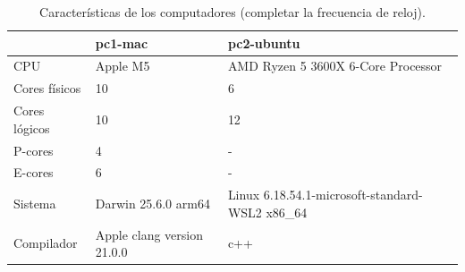 \begin{table}[H]
\centering\small
\caption{Características de los computadores (completar la frecuencia de reloj).}
\label{tab:g_maquinas}
\begin{tabular}{lll}
\toprule
 & pc1-mac & pc2-ubuntu \\
\midrule
CPU & Apple M5 & AMD Ryzen 5 3600X 6-Core Processor \\
Cores físicos & 10 & 6 \\
Cores lógicos & 10 & 12 \\
P-cores & 4 & - \\
E-cores & 6 & - \\
Sistema & Darwin 25.6.0 arm64 & Linux 6.18.54.1-microsoft-standard-WSL2 x86\_64 \\
Compilador & Apple clang version 21.0.0 & c++ \\
\bottomrule
\end{tabular}
\end{table}
